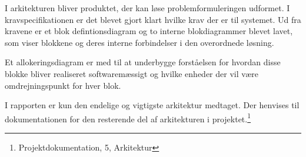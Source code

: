 
I arkitekturen bliver produktet, der kan løse problemformuleringen udformet. I kravspecifikationen er det blevet gjort klart hvilke krav der er til systemet. Ud fra kravene er et blok defintionsdiagram og to interne blokdiagrammer blevet lavet, som viser blokkene og deres interne forbindelser i den overordnede løsning.

Et allokeringsdiagram er med til at underbygge forståelsen for hvordan disse blokke bliver realiseret softwaremæssigt og hvilke enheder der vil være omdrejningspunkt for hver blok.

I rapporten er kun den endelige og vigtigste arkitektur medtaget. Der henvises til dokumentationen for den resterende del af arkitekturen i projektet.\footnote{Projektdokumentation, 5, Arkitektur}